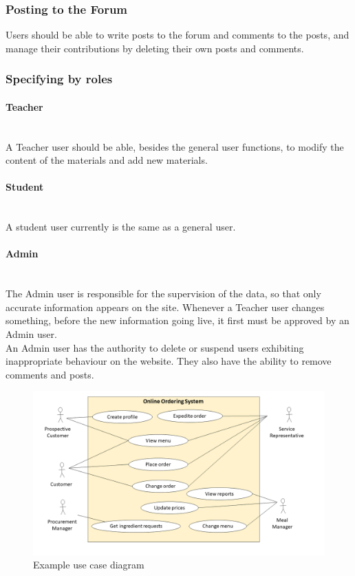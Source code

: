 \documentclass[12pt,a4paper]{article}
\begin{document}
\begin{spacing}{1.5}
    \subsubsection{Posting to the Forum}
    Users should be able to write posts to the forum and comments to the posts, and
    manage their contributions by deleting their own posts and comments.
    \subsubsection{Specifying by roles}
    \paragraph{Teacher} \mbox{} \\ \indent
    A Teacher user should be able, besides the general user functions, to modify the content of the materials and add new materials.
    \paragraph{Student} \mbox{} \\ \indent A student user currently is the same as a
    general user.
    \paragraph{Admin} \mbox{} \\ \indent The Admin user is responsible for the
    supervision of the data, so that only accurate information appears on the site.
    Whenever a Teacher user changes something, before the new information going
    live, it first must be approved by an Admin user. \\ \indent An Admin user has
    the authority to delete or suspend users exhibiting inappropriate behaviour on
    the website. They also have the ability to remove comments and posts.
    \begin{figure}[!htb]
        \centering
        \includegraphics[width=15cm]{assets/use-case-example.png}
        \caption{Example use case diagram}
    \end{figure}
    \FloatBarrier


\end{spacing}
\end{document}
